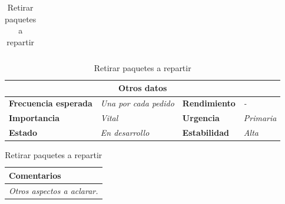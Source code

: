 \documentclass[12pt,spanish]{article}
\begin{document}
\begin{table}[H]
\begin{tabular}{|m{5pt}|m{7.33cm}|m{5pt}|m{7.33cm}|}
	\end{tabular}

	
	\vspace{0.5cm}
	
	\begin{tabular}{|m{3.75cm}|m{3.75cm}|m{3.75cm}|m{3.8cm}|}
		\hline
		\multicolumn{4}{|c|}{\textbf{Otros datos}} \\
		\hline
		\textbf{Frecuencia esperada} & \textit{Una por cada pedido} & \textbf{Rendimiento} & \textit{-} \\
		\hline
		\textbf{Importancia} & \textit{Vital} & \textbf{Urgencia} & \textit{Primaria} \\
		\hline
		\textbf{Estado} & \textit{En desarrollo} & \textbf{Estabilidad} & \textit{Alta} \\
		\hline
	\end{tabular}
	
	\vspace{1cm}
	
	\begin{tabular}{|m{16.2cm}|}
		\hline
		\textbf{Comentarios} \\
		\hline
		\textit{Otros aspectos a aclarar.} \\
		\hline
	\end{tabular}
	
	\caption{Retirar paquetes a repartir}

\end{table}
\end{document}
